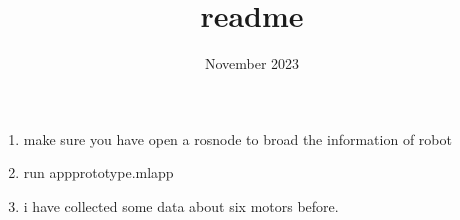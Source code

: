 \documentclass{article}
\title{readme}
\date{November 2023}
\begin{document}
\maketitle

\begin{enumerate}
  \item make sure you have open a rosnode to broad the information of robot
  \item run appprototype.mlapp
  \item i have collected some data about six motors before.
\end{enumerate}
\end{document}
